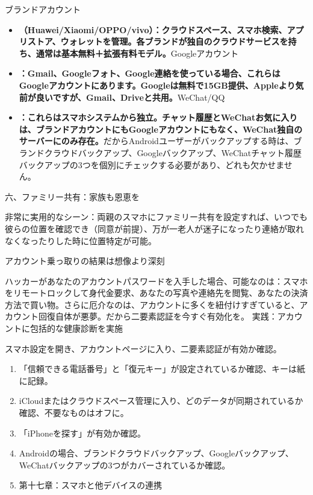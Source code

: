 
ブランドアカウント

\begin{itemize}
  \item \textbf{（Huawei/Xiaomi/OPPO/vivo）：クラウドスペース、スマホ検索、アプリストア、ウォレットを管理。各ブランドが独自のクラウドサービスを持ち、通常は基本無料＋拡張有料モデル。}Googleアカウント
  \item \textbf{：Gmail、Googleフォト、Google連絡を使っている場合、これらはGoogleアカウントにあります。Googleは無料で15GB提供、Appleより気前が良いですが、Gmail、Driveと共用。}WeChat/QQ
  \item \textbf{：これらはスマホシステムから独立。チャット履歴とWeChatお気に入りは、ブランドアカウントにもGoogleアカウントにもなく、WeChat独自のサーバーにのみ存在。}だからAndroidユーザーがバックアップする時は、ブランドクラウドバックアップ、Googleバックアップ、WeChatチャット履歴バックアップの3つを個別にチェックする必要があり、どれも欠かせません。
\end{itemize}

六、ファミリー共有：家族も恩恵を


非常に実用的なシーン：両親のスマホにファミリー共有を設定すれば、いつでも彼らの位置を確認でき（同意が前提）、万が一老人が迷子になったり連絡が取れなくなったりした時に位置特定が可能。

アカウント乗っ取りの結果は想像より深刻

\begin{tcbwarn}{ハッカーがあなたのアカウントパスワードを入手した場合、可能なのは：スマホをリモートロックして身代金要求、あなたの写真や連絡先を閲覧、あなたの決済方法で買い物。さらに厄介なのは、アカウントに多くを紐付けすぎていると、アカウント回復自体が悪夢。だから二要素認証を今すぐ有効化を。}
実践：アカウントに包括的な健康診断を実施

\end{tcbwarn}

\begin{tcbpractice}{スマホ設定を開き、アカウントページに入り、二要素認証が有効か確認。}
\begin{enumerate}
  \item 「信頼できる電話番号」と「復元キー」が設定されているか確認、キーは紙に記録。
  \item iCloudまたはクラウドスペース管理に入り、どのデータが同期されているか確認、不要なものはオフに。
  \item 「iPhoneを探す」が有効か確認。
  \item Androidの場合、ブランドクラウドバックアップ、Googleバックアップ、WeChatバックアップの3つがカバーされているか確認。
  \item 第十七章：スマホと他デバイスの連携
\end{enumerate}

\end{tcbpractice}
